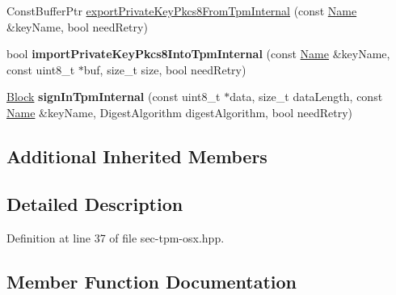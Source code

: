 \begin{DoxyCompactItemize}
\item 
Const\+Buffer\+Ptr \hyperlink{classndn_1_1SecTpmOsx_aef0df910b9559aa9eda0c36985508c53}{export\+Private\+Key\+Pkcs8\+From\+Tpm\+Internal} (const \hyperlink{classndn_1_1Name}{Name} \&key\+Name, bool need\+Retry)
\item 
bool {\bfseries import\+Private\+Key\+Pkcs8\+Into\+Tpm\+Internal} (const \hyperlink{classndn_1_1Name}{Name} \&key\+Name, const uint8\+\_\+t $\ast$buf, size\+\_\+t size, bool need\+Retry)\hypertarget{classndn_1_1SecTpmOsx_acbeab83dff76bc97ee27f1a341c8e773}{}\label{classndn_1_1SecTpmOsx_acbeab83dff76bc97ee27f1a341c8e773}

\item 
\hyperlink{classndn_1_1Block}{Block} {\bfseries sign\+In\+Tpm\+Internal} (const uint8\+\_\+t $\ast$data, size\+\_\+t data\+Length, const \hyperlink{classndn_1_1Name}{Name} \&key\+Name, Digest\+Algorithm digest\+Algorithm, bool need\+Retry)\hypertarget{classndn_1_1SecTpmOsx_afa6316dd7dda396dd5576628d9c20314}{}\label{classndn_1_1SecTpmOsx_afa6316dd7dda396dd5576628d9c20314}

\end{DoxyCompactItemize}
\subsection*{Additional Inherited Members}


\subsection{Detailed Description}


Definition at line 37 of file sec-\/tpm-\/osx.\+hpp.



\subsection{Member Function Documentation}
